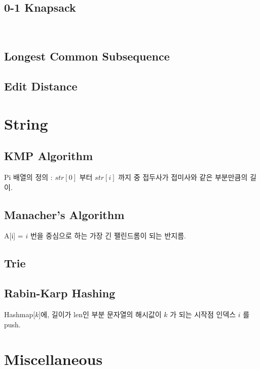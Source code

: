 \documentclass[landscape,8pt]{article}
\begin{document}
\begin{multicols}{2}
  \subsection{0-1 Knapsack}
    \

  \subsection{Longest Common Subsequence}
    

  \subsection{Edit Distance}
    

\section{String}
  \subsection{KMP Algorithm}
    Pi 배열의 정의 : $str[0]$ 부터 $str[i]$ 까지 중 접두사가 접미사와 같은 부분만큼의 길이.
    
  \subsection{Manacher's Algorithm}
    A[i] = $i$ 번을 중심으로 하는 가장 긴 팰린드롬이 되는 반지름.
    
  \subsection{Trie}
    
  \subsection{Rabin-Karp Hashing}
    Hashmap[$k$]에, 길이가 len인 부분 문자열의 해시값이 $k$ 가 되는 시작점 인덱스 $i$ 를 push.
    
\columnbreak

\section{Miscellaneous}

\end{multicols}
\end{document}

